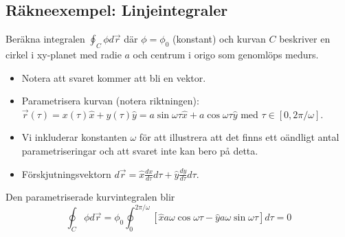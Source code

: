 \documentclass[%
oneside,                 %
final,                   %
10pt]{article}
\newenvironment{notice_mdfboxadmon}[1][]{
\begin{notice_mdfboxmdframed}[frametitle=#1]
}
{
\end{notice_mdfboxmdframed}
}
\begin{document}
\subsection*{Räkneexempel: Linjeintegraler}


\begin{notice_mdfboxadmon}

Beräkna integralen $\oint_C \phi d\vec{r}$ där $\phi = \phi_0$ (konstant) och kurvan $C$ beskriver en cirkel i xy-planet med radie $a$ och centrum i origo som genomlöps medurs.

\begin{itemize}
\item Notera att svaret kommer att bli en vektor.

\item Parametrisera kurvan (notera riktningen): $\vec{r}(\tau) = x(\tau)\hat{x} + y(\tau)\hat{y} = a \sin\omega\tau \hat{x} + a \cos\omega\tau \hat{y}$ med $\tau \in [0,2\pi/\omega]$.

\item Vi inkluderar konstanten $\omega$ för att illustrera att det finns ett oändligt antal parametriseringar och att svaret inte kan bero på detta.

\item Förskjutningsvektorn $d\vec{r} = \hat{x} \frac{dx}{d\tau}d\tau + \hat{y} \frac{dy}{d\tau}d\tau$.
\end{itemize}

\noindent
Den parametriserade kurvintegralen blir
\begin{equation}
\oint_C \phi d\vec{r} = \phi_0 \oint_0^{2\pi/\omega} \left[
\hat{x} a \omega\cos\omega\tau - \hat{y} a \omega\sin\omega\tau \right] d\tau = 0
\end{equation}
\end{notice_mdfboxadmon} %
\end{document}
